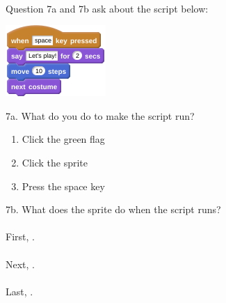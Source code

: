 \documentclass[letterpaper,12pt]{article}
\begin{document}
\noindent \dotfill \\

Question 7a and 7b ask about the script below:
\begin{center}
\includegraphics[scale=1]{q7_script0.png}
\end{center}

\noindent 7a. What do you do to make the script run?
\renewcommand{\theenumi}{\Alph{enumi}}
\begin{enumerate}
\item Click the green flag
\item Click the sprite
\item Press the space key \\
\end{enumerate}

\noindent 7b. What does the sprite do when the script runs? \\ \\

\noindent First, \hrulefill . \\ \\
Next, \hrulefill . \\ \\
Last, \hrulefill . \\ \\
\end{document}
